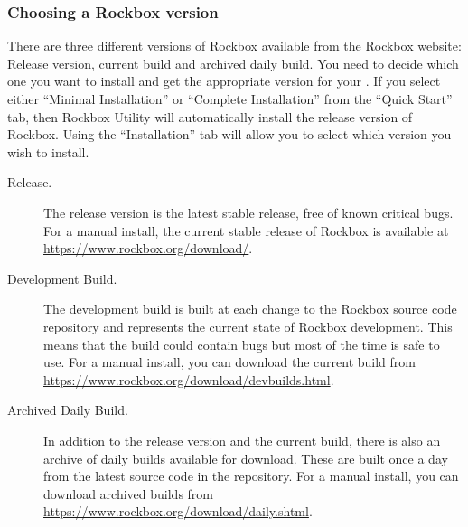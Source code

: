 {
}
\subsubsection{Choosing a Rockbox version}\label{sec:choosing_version}

There are three different versions of Rockbox available from the
Rockbox website:
\label{Version}
Release version, current build and archived daily build. You need to decide which one
you want to install and get the appropriate version for your \dap{}. If you
select either ``Minimal Installation'' or ``Complete Installation'' from the
``Quick Start'' tab, then Rockbox Utility will automatically install the
release version of Rockbox. Using the ``Installation'' tab will allow you
to select which version you wish to install.


\begin{description}

\item[Release.] The release version is the latest stable release, free
   of known critical bugs. For a manual install, the current stable release of Rockbox is
   available at \url{https://www.rockbox.org/download/}.

\item[Development Build.] The development build is built at each change to
  the Rockbox source code repository and represents the current state of Rockbox
  development. This means that the build could contain bugs but most of
  the time is safe to use. For a manual install, you can download the current build from
  \url{https://www.rockbox.org/download/devbuilds.html}.

\item[Archived Daily Build.] In addition to the release version and the current build,
  there is also an archive of daily builds available for download. These are
  built once a day from the latest source code in the repository. For a manual install,
  you can download archived builds from \url{https://www.rockbox.org/download/daily.shtml}.

\end{description}


